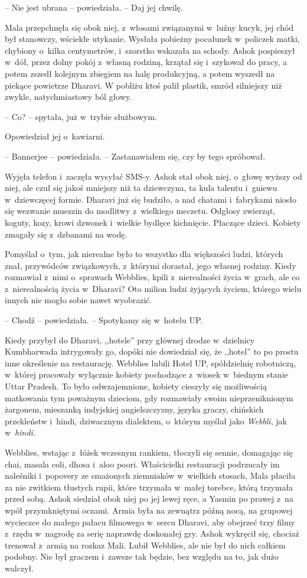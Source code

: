 \documentclass[oneside,polish,11pt,rmheadings]{mwbk}
\begin{document}
-- Nie jest ubrana -- powiedziała. -- Daj jej chwilę.

Mala przepchnęła się obok niej, z~włosami związanymi w~luźny kucyk, jej chód był stanowczy, wściekłe utykanie. Wysłała pobieżny pocałunek w~policzek matki, chybiony o~kilka centymetrów, i~szorstko wskazała na schody. Ashok pospieszył w~dół, przez dolny pokój z~własną rodziną, krzątał się i~szykował do pracy, a potem zszedł kolejnym zbiegiem na halę produkcyjną, a potem wyszedł na piekące powietrze Dharavi. W pobliżu ktoś palił plastik, smród silniejszy niż zwykle, natychmiastowy ból głowy.

-- Co? -- spytała, już w~trybie służbowym.

Opowiedział jej o~kawiarni.

-- Bannerjee -- powiedziała. -- Zastanawiałem się, czy by tego spróbował. 

 Wyjęła telefon i~zaczęła wysyłać SMS-y. Ashok stał obok niej, o~głowę wyższy od niej, ale czuł się jakoś mniejszy niż ta dziewczyna, ta kula talentu i~gniewu w~dziewczęcej formie. Dharavi już się budziło, a nad chatami i~fabrykami niosło się wezwanie muezzin do modlitwy z~wielkiego meczetu. Odgłosy zwierząt, koguty, kozy, krowi dzwonek i~wielkie bydlęce kichnięcie. Płaczące dzieci. Kobiety zmagały się z~dzbanami na wodę.

Pomyślał o~tym, jak nierealne było to wszystko dla większości ludzi, których znał, przywódców związkowych, z~którymi dorastał, jego własnej rodziny. Kiedy rozmawiał z~nimi o~sprawach Webblies, kpili z~nierealności życia w~grach, ale co z~nierealnością życia w~Dharavi? Oto milion ludzi żyjących życiem, którego wielu innych nie mogło sobie nawet wyobrazić.

-- Chodź -- powiedziała. -- Spotykamy się w~hotelu UP.

Kiedy przybył do Dharavi, ,,hotele'' przy głównej drodze w~dzielnicy Kumbharwada intrygowały go, dopóki nie dowiedział się, że ,,hotel'' to po prostu inne określenie na restaurację. Webblies lubili Hotel UP, spółdzielnię robotniczą, w~której pracowały wyłącznie kobiety pochodzące z~wiosek w~biednym stanie Uttar Pradesh. To było odwzajemnione, kobiety cieszyły się możliwością matkowania tym poważnym dzieciom, gdy rozmawiały swoim nieprzeniknionym żargonem, mieszanką indyjskiej angielszczyzny, języka graczy, chińskich przekleństw i~hindi, dziwacznym dialektem, o~którym myślał jako \textit{Webbli}, jak w~\textit{hindi}.

Webblies, wstając z~łóżek wczesnym rankiem, tłoczyli się sennie, domagając się chai, masala coli, dhosa i~aloo poori. Właścicielki restauracji podrzucały im naleśniki i~popovery ze smażonych ziemniaków w~wielkich stosach, Mala płaciła za nie zwitkiem tłustych rupii, które trzymała w~małej torebce, którą trzymała przed sobą. Ashok siedział obok niej po jej lewej ręce, a Yasmin po prawej z~na wpół przymkniętymi oczami. Armia była na zewnątrz późną nocą, na grupowej wycieczce do małego pałacu filmowego w~sercu Dharavi, aby obejrzeć trzy filmy z~rzędu w~nagrodę za serię naprawdę doskonałej gry. Ashok wykręcił się, chociaż trenował z~armią na rozkaz Mali. Lubił Webblies, ale nie był do nich całkiem podobny. Nie był graczem i~zawsze tak będzie, bez względu na to, jak dużo walczył.
\end{document}
